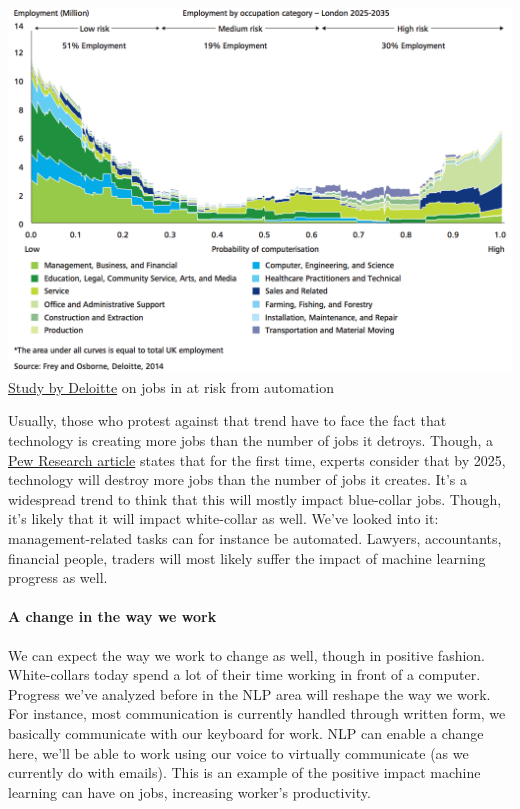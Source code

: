 \documentclass[12pt]{article}
\begin{document}
{\smallskip
\includegraphics[width=\textwidth]{jobs}
\href{http://www2.deloitte.com/content/dam/Deloitte/uk/Documents/uk-futures/london-futures-agiletown.pdf}{Study by Deloitte} on jobs in at risk from automation
\smallskip

Usually, those who protest against that trend have to face the fact that technology is creating more jobs than the number of jobs it detroys. Though, a \href{http://www.pewinternet.org/2014/08/06/future-of-jobs/}{Pew Research article} states that for the first time, experts consider that by 2025, technology will destroy more jobs than the number of jobs it creates. It's a widespread trend to think that this will mostly impact blue-collar jobs. Though, it's likely that it will impact white-collar as well. We've looked into it: management-related tasks can for instance be automated. Lawyers, accountants, financial people, traders will most likely suffer the impact of machine learning progress as well.



\paragraph{A change in the way we work}

We can expect the way we work to change as well, though in positive fashion. White-collars today spend a lot of their time working in front of a computer. Progress we've analyzed before in the NLP area will reshape the way we work. For instance, most communication is currently handled through written form, we basically communicate with our keyboard for work. NLP can enable a change here, we'll be able to work using our voice to virtually communicate (as we currently do with emails). This is an example of the positive impact machine learning can have on jobs, increasing worker's productivity.

}
\end{document}
